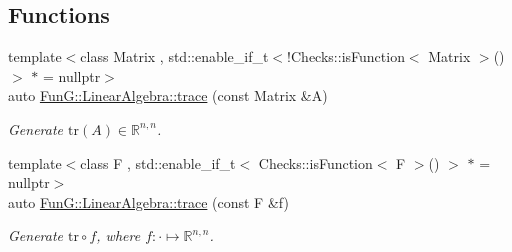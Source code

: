 \subsection*{Functions}
\begin{DoxyCompactItemize}
\item 
{\footnotesize template$<$class Matrix , std\-::enable\-\_\-if\-\_\-t$<$!\-Checks\-::is\-Function$<$ Matrix $>$()$>$ $\ast$  = nullptr$>$ }\\auto \hyperlink{group__LinearAlgebraGroup_ga4d73eb4d46dd9196a31e2d6d557d509e}{Fun\-G\-::\-Linear\-Algebra\-::trace} (const Matrix \&A)
\begin{DoxyCompactList}\small\item\em Generate $\mathrm{tr}(A)\in\mathbb{R}^{n,n}$. \end{DoxyCompactList}\item 
{\footnotesize template$<$class F , std\-::enable\-\_\-if\-\_\-t$<$ Checks\-::is\-Function$<$ F $>$() $>$ $\ast$  = nullptr$>$ }\\auto \hyperlink{group__LinearAlgebraGroup_ga950717870525c43be79245413717673c}{Fun\-G\-::\-Linear\-Algebra\-::trace} (const F \&f)
\begin{DoxyCompactList}\small\item\em Generate $\mathrm{tr}\circ f$, where $f:\cdot\mapsto\mathbb{R}^{n,n} $. \end{DoxyCompactList}\end{DoxyCompactItemize}
